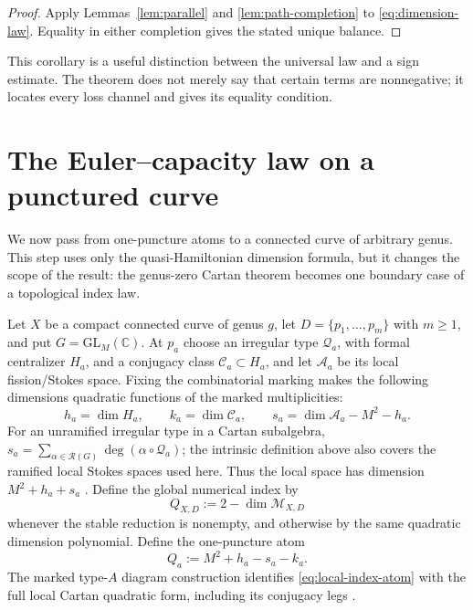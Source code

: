 \documentclass[11pt,a4paper]{amsart}
\theoremstyle{plain}
\theoremstyle{definition}
\newcommand{\CC}{\mathbb C}
\newcommand{\Mcal}{\mathcal M}
\begin{document}
\begin{proof}
Apply Lemmas~\ref{lem:parallel} and \ref{lem:path-completion} to
\eqref{eq:dimension-law}.  Equality in either completion gives the stated unique balance.
\end{proof}

This corollary is a useful distinction between the universal law and a sign estimate.  The theorem
does not merely say that certain terms are nonnegative; it locates every loss channel and gives its
equality condition.

\section{The Euler--capacity law on a punctured curve}\label{sec:global}

We now pass from one-puncture atoms to a connected curve of arbitrary genus.  This step uses only
the quasi-Hamiltonian dimension formula, but it changes the scope of the result: the genus-zero
Cartan theorem becomes one boundary case of a topological index law.

Let $X$ be a compact connected curve of genus $g$, let
$D=\{p_1,\ldots,p_m\}$ with $m\ge1$, and put $G=\mathrm{GL}_M(\CC)$.  At $p_a$ choose an irregular
type $\mathcal Q_a$, with formal centralizer $H_a$, and a conjugacy class
$\mathcal C_a\subset H_a$, and let $\mathcal A_a$ be its local fission/Stokes space.  Fixing the
combinatorial marking makes the following dimensions quadratic functions of the marked
multiplicities:
\[
 h_a=\dim H_a,\qquad k_a=\dim\mathcal C_a,\qquad
 s_a=\dim\mathcal A_a-M^2-h_a.
\]
For an unramified irregular type in a Cartan subalgebra,
$s_a=\sum_{\alpha\in\mathcal R(G)}\deg(\alpha\circ\mathcal Q_a)$; the intrinsic definition above
also covers the ramified local Stokes spaces used here.  Thus the local space has dimension
$M^2+h_a+s_a$ \cite{Boalch2014Geometry,BoalchYamakawa2015Twisted}.  Define the global numerical index by
\begin{equation}\label{eq:global-index-definition}
 Q_{X,D}:=2-\dim\Mcal_{X,D}
\end{equation}
whenever the stable reduction is nonempty, and otherwise by the same quadratic dimension
polynomial.  Define the one-puncture atom
\begin{equation}\label{eq:local-index-atom}
                         Q_a:=M^2+h_a-s_a-k_a.
\end{equation}
The marked type-$A$ diagram construction identifies \eqref{eq:local-index-atom} with the full local
Cartan quadratic form, including its conjugacy legs
\cite{BoalchYamakawa2020,Doucot2021Diagrams}.
\end{document}
